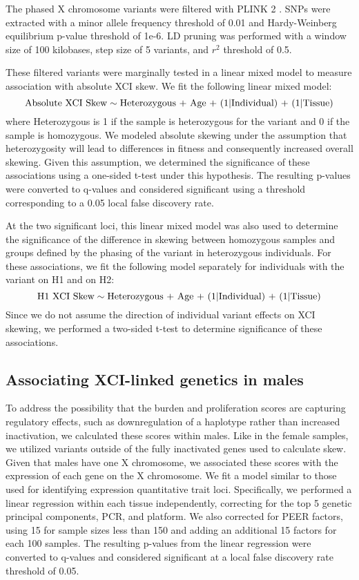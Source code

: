 The phased X chromosome variants were filtered with PLINK 2 \cite{PLINK2}. SNPs were extracted with a minor allele frequency threshold of 0.01 and Hardy-Weinberg equilibrium p-value threshold of 1e-6. LD pruning was performed with a window size of 100 kilobases, step size of 5 variants, and $r^2$ threshold of 0.5. 

These filtered variants were marginally tested in a linear mixed model to measure association with absolute XCI skew. We fit the following linear mixed model:
\begin{equation}
\text{Absolute XCI Skew} \sim \text{Heterozygous + Age + (1\textbar Individual) + (1\textbar Tissue)}
\end{equation}
where Heterozygous is 1 if the sample is heterozygous for the variant and 0 if the sample is homozygous. We modeled absolute skewing under the assumption that heterozygosity will lead to differences in fitness and consequently increased overall skewing. Given this assumption, we determined the significance of these associations using a one-sided t-test under this hypothesis. The resulting p-values were converted to q-values \cite{Storey2003-kx} and considered significant using a threshold corresponding to a 0.05 local false discovery rate.

At the two significant loci, this linear mixed model was also used to determine the significance of the difference in skewing between homozygous samples and groups defined by the phasing of the variant in heterozygous individuals. For these associations, we fit the following model separately for individuals with the variant on H1 and on H2:
\begin{equation}
\text{H1 XCI Skew} \sim \text{Heterozygous + Age + (1\textbar Individual) + (1\textbar Tissue)}
\end{equation}
Since we do not assume the direction of individual variant effects on XCI skewing, we performed a two-sided t-test to determine significance of these associations. 

\subsection{Associating XCI-linked genetics in males}

To address the possibility that the burden and proliferation scores are capturing regulatory effects, such as downregulation of a haplotype rather than increased inactivation, we calculated these scores within males. Like in the female samples, we utilized variants outside of the fully inactivated genes used to calculate skew. Given that males have one X chromosome, we associated these scores with the expression of each gene on the X chromosome. We fit a model similar to those used for identifying expression quantitative trait loci. Specifically, we performed a linear regression within each tissue independently, correcting for the top 5 genetic principal components, PCR, and platform. We also corrected for PEER factors, \cite{Stegle2012-uf} using 15 for sample sizes less than 150 and adding an additional 15 factors for each 100 samples. The resulting p-values from the linear regression were converted to q-values \cite{Storey2003-kx} and considered significant at a local false discovery rate threshold of 0.05. 

